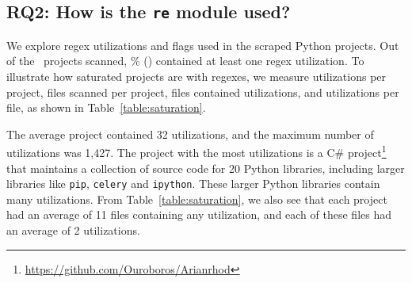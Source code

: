 \subsection{RQ2: How  is the {\tt re} module used?}
We explore regex utilizations and flags used in the scraped Python projects. 
Out of the \ projects scanned, \% () contained at least one regex utilization.  To illustrate how saturated projects are with regexes, we measure utilizations per project, files scanned per project, files contained utilizations, and  utilizations  per file, as shown in Table~\ref{table:saturation}.

The average project contained 32 utilizations, and the maximum number of utilizations was 1,427.  The project with the most utilizations is a C\# project\footnote{\url{https://github.com/Ouroboros/Arianrhod}} that maintains a collection of source code for 20 Python libraries, including larger libraries like {\tt pip}, {\tt celery} and {\tt ipython}.  These larger Python libraries contain many utilizations.
From Table~\ref{table:saturation}, we also see that each project had an average of 11 files containing any utilization, and each of these files had an average of 2 utilizations.







